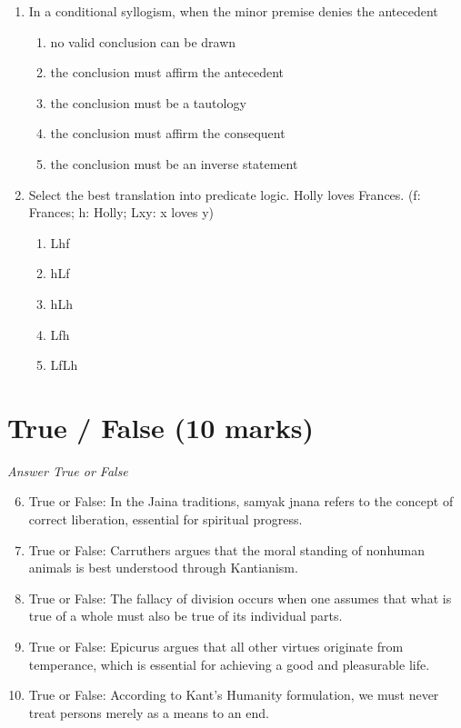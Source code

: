 \documentclass[12pt]{article}
\begin{document}
\begin{enumerate}[label=\arabic*.]
\begin{enumerate}[label=(\alph*)]
\end{enumerate}
\item In a conditional syllogism, when the minor premise denies the antecedent
\begin{enumerate}[label=(\alph*)]
    \item no valid conclusion can be drawn
    \item the conclusion must affirm the antecedent
    \item the conclusion must be a tautology
    \item the conclusion must affirm the consequent
    \item the conclusion must be an inverse statement
\end{enumerate}
\item Select the best translation into predicate logic. Holly loves Frances. (f: Frances; h: Holly; Lxy: x loves y)
\begin{enumerate}[label=(\alph*)]
    \item Lhf
    \item hLf
    \item hLh
    \item Lfh
    \item LfLh
\end{enumerate}
\end{enumerate}

\section*{True / False (10 marks)}
\textit{Answer True or False}
\begin{enumerate}[label=\arabic*.]
\setcounter{enumi}{5}
\item True or False: In the Jaina traditions, samyak jnana refers to the concept of correct liberation, essential for spiritual progress.
\item True or False: Carruthers argues that the moral standing of nonhuman animals is best understood through Kantianism.
\item True or False: The fallacy of division occurs when one assumes that what is true of a whole must also be true of its individual parts.
\item True or False: Epicurus argues that all other virtues originate from temperance, which is essential for achieving a good and pleasurable life.
\item True or False: According to Kant's Humanity formulation, we must never treat persons merely as a means to an end.
\end{enumerate}
\end{document}
